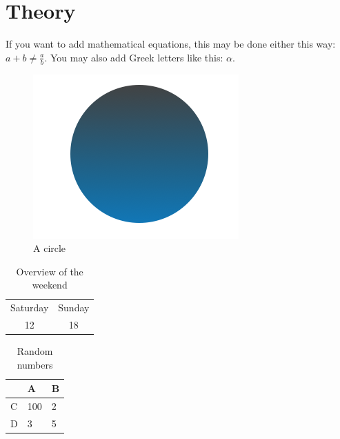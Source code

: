 \documentclass[11pt, a4paper]{article} %
\begin{document}
\section{Theory}

If you want to add mathematical equations, this may be done either this way: $a +  b \neq \frac{a}{b}$. You may also add Greek letters like this: $\alpha$.\\ 

\blindtext %

\begin{figure}[htpb!] %
    \centering %
\includegraphics[scale=0.8]{figure/figure.png} %
    \caption{A circle} %
    \label{fig:my_label} %
\end{figure}

\blindtext %

\begin{table}[] %
    \centering
    \begin{tabular}{c|c}
        Saturday & Sunday \\
        12 & 18
    \end{tabular}
    \caption{Overview of the weekend}%
    \label{tab:weekend} %
\end{table}

\begin{table}[] %
    \centering
\begin{tabular}{@{}lll@{}}
\toprule
  & A   & B \\ \midrule
C & 100 & 2 \\
D & 3   & 5 \\ \bottomrule
\end{tabular}
    \caption{Random numbers} %
    \label{tab:numbers} %
\end{table}
\end{document}
